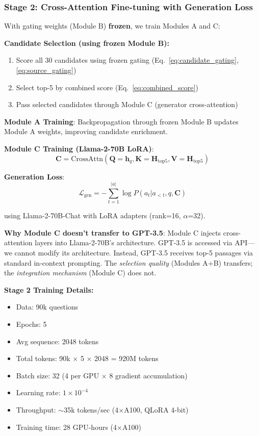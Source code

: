 \documentclass[10pt,twocolumn]{article}
\begin{document}
\subsubsection{Stage 2: Cross-Attention Fine-tuning with Generation Loss}
\label{sec:stage2}

With gating weights (Module B) \textbf{frozen}, we train Modules A and C:

\textbf{Candidate Selection (using frozen Module B):}
\begin{enumerate}
    \item Score all 30 candidates using frozen gating (Eq.~\ref{eq:candidate_gating}, \ref{eq:source_gating})
    \item Select top-5 by combined score (Eq.~\ref{eq:combined_score})
    \item Pass selected candidates through Module C (generator cross-attention)
\end{enumerate}

\textbf{Module A Training}: Backpropagation through frozen Module B updates Module A weights, improving candidate enrichment.

\textbf{Module C Training (Llama-2-70B LoRA)}:
\begin{equation}
\mathbf{C} = \text{CrossAttn}(\mathbf{Q}=\mathbf{h}_q, \mathbf{K}=\mathbf{H}_{\text{top5}}, \mathbf{V}=\mathbf{H}_{\text{top5}})
\end{equation}

\textbf{Generation Loss}:
\begin{equation}
\mathcal{L}_{\text{gen}} = -\sum_{t=1}^{|a|} \log P(a_t | a_{<t}, q, \mathbf{C})
\label{eq:gen_loss}
\end{equation}

using Llama-2-70B-Chat with LoRA adapters \cite{hu2022lora} (rank=16, $\alpha$=32).

\textbf{Why Module C doesn't transfer to GPT-3.5}: Module C injects cross-attention layers into Llama-2-70B's architecture. GPT-3.5 is accessed via API—we cannot modify its architecture. Instead, GPT-3.5 receives top-5 passages via standard in-context prompting. The \textit{selection quality} (Modules A+B) transfers; the \textit{integration mechanism} (Module C) does not.

\textbf{Stage 2 Training Details:}
\begin{itemize}
    \item Data: 90k questions
    \item Epochs: 5
    \item Avg sequence: 2048 tokens
    \item Total tokens: 90k $\times$ 5 $\times$ 2048 = 920M tokens
    \item Batch size: 32 (4 per GPU $\times$ 8 gradient accumulation)
    \item Learning rate: $1 \times 10^{-4}$
    \item Throughput: $\sim$35k tokens/sec (4$\times$A100, QLoRA 4-bit) \cite{dettmers2023qlora}
    \item Training time: 28 GPU-hours (4$\times$A100)
\end{itemize}
\end{document}
